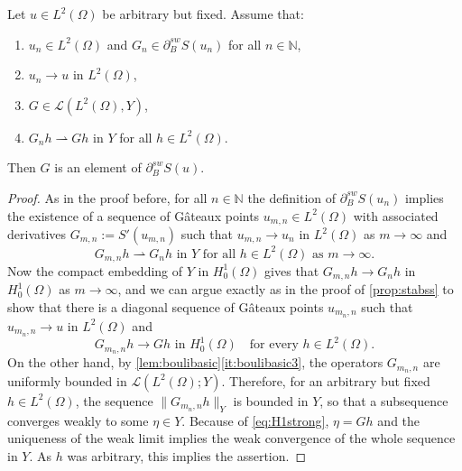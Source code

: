 \documentclass[reqno]{shinyart}
\begin{document}
\begin{proposition}\label{prop:stabsw}
    Let $u \in L^2(\Omega)$ be arbitrary but fixed. Assume that:
    \begin{enumerate}[label=(\roman*)]
        \item $u_n \in L^2(\Omega)$ and  $G_n \in \partial_{B}^{sw} S(u_n)$ for all $n \in {\mathbb{N}}$,
        \item $u_n \to u$ in $L^2(\Omega)$,
        \item $G \in \mathcal{L}(L^2(\Omega), Y)$,
        \item $G_n h  {\rightharpoonup} G h$ in $Y$ for all $h \in L^2(\Omega)$.
    \end{enumerate}
    Then $G$ is an element of $\partial_{B}^{sw} S(u)$.
\end{proposition}
\begin{proof}
    As in the proof before, for all $n \in \mathbb{N}$ the definition of $\partial_{B}^{sw} S(u_n)$  
    implies the existence of a sequence of G\^ateaux points 
    $u_{m,n} \in L^2(\Omega)$ with associated derivatives $G_{m, n}:= S'(u_{m,n})$ 
    such that $u_{m, n} \to u_n$ in $L^2(\Omega)$ as $m \to \infty$ and
    \begin{equation*}
        G_{m,n}h {\rightharpoonup} G_n h \text{ in } Y
        \text{ for all }h \in L^2(\Omega) \text{ as }m\to \infty. 
    \end{equation*}
    Now the compact embedding of $Y$ in $H^1_0(\Omega)$ gives that 
    $G_{m,n}h \to G_n h$ in $H^1_0(\Omega)$ as $m\to \infty$, 
    and we can argue exactly as in the 
    proof of \cref{prop:stabss} to show that there is a diagonal sequence of 
    G\^ateaux points $u_{m_n,n}$ such that $u_{m_n,n} \to u$ in $L^2(\Omega)$ and 
    \begin{equation}\label{eq:H1strong}
        G_{m_n,n} h \to G h \text{ in } H^1_0(\Omega) \quad \text{for every } h\in L^2(\Omega).  
    \end{equation}
    On the other hand, by \cref{lem:boulibasic}\ref{it:boulibasic3}, 
    the operators $G_{m_n,n}$ are uniformly bounded in ${\mathcal{L}}(L^2(\Omega);Y)$. 
    Therefore, for an arbitrary but fixed 
    $h\in L^2(\Omega)$, the sequence $\|G_{m_n,n} h\|_Y$ is bounded in $Y$, so that a 
    subsequence converges weakly to some $\eta \in Y$. Because of \eqref{eq:H1strong}, 
    $\eta = G h$ and the uniqueness of the weak limit implies the weak convergence of the whole 
    sequence in $Y$. As $h$ was arbitrary, this implies the assertion.
\end{proof}
\end{document}

